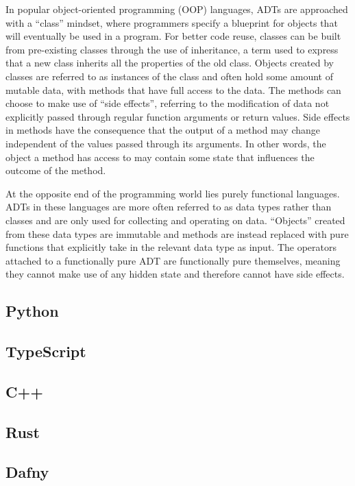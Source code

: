 \documentclass{article}
\begin{document}
In popular object-oriented programming (OOP) languages,
ADTs are approached with a ``class'' mindset, where programmers specify a blueprint for objects that
will eventually be used in a program. For better code reuse, classes can be built from pre-existing classes
through the use of inheritance, a term used to express that a new class inherits all the properties of the old class.
Objects created by classes are referred to as instances of the class and often hold
some amount of mutable data, with methods that have full access to the data. The methods can choose to make use of
``side effects'', referring to the modification of data not explicitly passed through
regular function arguments or return values. Side effects in methods have the consequence that the output of
a method may change independent of the values passed through its arguments. In other words,
the object a method has access to may contain some state that influences the outcome of the method.

At the opposite end of the programming world lies purely functional languages. ADTs in these languages
are more often referred to as data types rather than classes and are only used for collecting and operating on data.
``Objects'' created from these data types are immutable and methods are instead replaced with pure functions that
explicitly take in the relevant data type as input. The operators attached to a functionally pure ADT are functionally pure themselves,
meaning they cannot make use of any hidden state and therefore cannot have side effects.

\subsection{Python}

\subsection{TypeScript}
\subsection{C++}
\subsection{Rust}
\subsection{Dafny}
\end{document}
